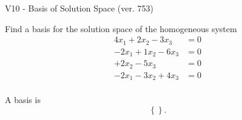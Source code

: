 \begin{exercise}
  \begin{exerciseTitle}V10 - Basis of Solution Space (ver. 753)\end{exerciseTitle}
  \begin{exerciseStatement}
    Find a basis for the solution space of the homogeneous system 
\begin{align*}
 4 x_ 1 + 2 x_ 2 -3 x_ 3 &= 0  \\ 
  -2 x_ 1 + 1 x_ 2 -6 x_ 3 &= 0  \\ 
  + 2 x_ 2 -5 x_ 3 &= 0  \\ 
  -2 x_ 1 -3 x_ 2 + 4 x_ 3 &= 0  \\ 
 \end{align*}


 
  \end{exerciseStatement}

  \begin{exerciseAnswer}
   A basis is   
\[\left\{\right\}.\]

  


  \end{exerciseAnswer}
\end{exercise}